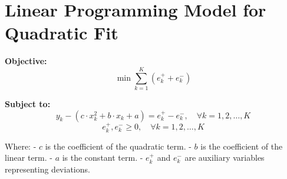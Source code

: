 \documentclass{article}
\begin{document}
\section*{Linear Programming Model for Quadratic Fit}

\textbf{Objective:}
\[
\min \sum_{k=1}^{K} (e_k^+ + e_k^-)
\]

\textbf{Subject to:}
\[
y_k - (c \cdot x_k^2 + b \cdot x_k + a) = e_k^+ - e_k^-, \quad \forall k = 1, 2, \ldots, K
\]
\[
e_k^+, e_k^- \geq 0, \quad \forall k = 1, 2, \ldots, K
\]

Where:
- \( c \) is the coefficient of the quadratic term.
- \( b \) is the coefficient of the linear term.
- \( a \) is the constant term.
- \( e_k^+ \) and \( e_k^- \) are auxiliary variables representing deviations.
\end{document}
